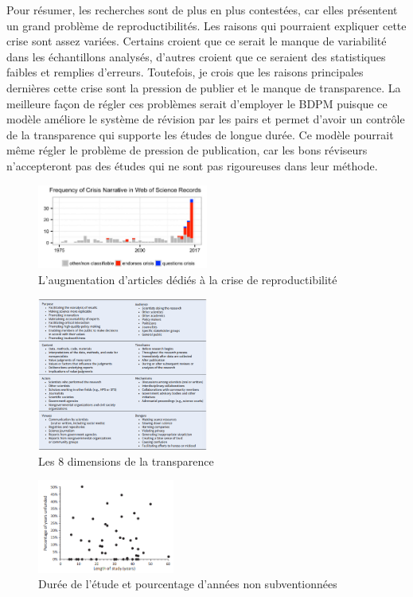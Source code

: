 \documentclass[9pt,twocolumn,twoside,]{pnas-new}
\begin{document}
Pour résumer, les recherches sont de plus en plus contestées, car elles
présentent un grand problème de reproductibilités. Les raisons qui
pourraient expliquer cette crise sont assez variées. Certains croient
que ce serait le manque de variabilité dans les échantillons analysés,
d'autres croient que ce seraient des statistiques faibles et remplies
d'erreurs. Toutefois, je crois que les raisons principales dernières
cette crise sont la pression de publier et le manque de transparence. La
meilleure façon de régler ces problèmes serait d'employer le BDPM
puisque ce modèle améliore le système de révision par les pairs et
permet d'avoir un contrôle de la transparence qui supporte les études de
longue durée. Ce modèle pourrait même régler le problème de pression de
publication, car les bons réviseurs n'accepteront pas des études qui ne
sont pas rigoureuses dans leur méthode.

\begin{figure}
\centering
\includegraphics[width=0.5\textwidth,height=0.5\textheight]{image intro .png}
\caption{L'augmentation d'articles dédiés à la crise de
reproductibilité}
\end{figure}

\begin{figure}
\centering
\includegraphics[width=0.5\textwidth,height=0.4\textheight]{Transparence.png}
\caption{Les 8 dimensions de la transparence}
\end{figure}

\begin{figure}
\centering
\includegraphics[width=0.4\textwidth,height=0.4\textheight]{Subventions.png}
\caption{Durée de l'étude et pourcentage d'années non subventionnées}
\end{figure}
\end{document}
